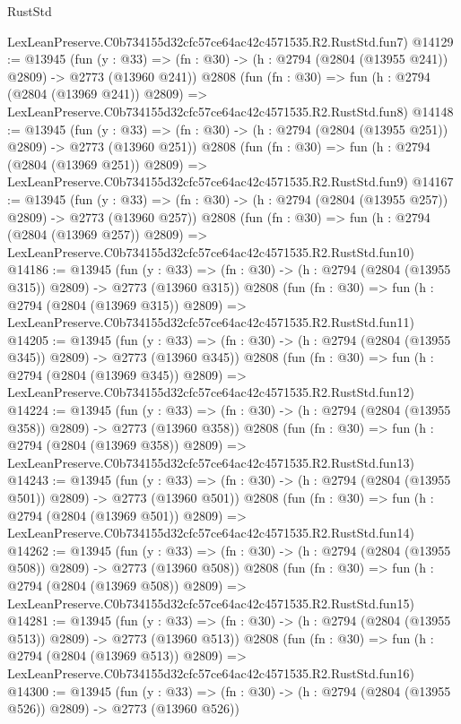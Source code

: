\begin{lexlean}{RustStd}
\begin{coremodule}
    LexLeanPreserve.C0b734155d32cfc57ce64ac42c4571535.R2.RustStd.fun7)
@14129 := @13945
    (fun (y : @33) => (fn : @30) -> (h : @2794 (@2804 (@13955 @241)) @2809) -> @2773 (@13960 @241))
    @2808
    (fun (fn : @30) =>
    fun (h : @2794 (@2804 (@13969 @241)) @2809) =>
    LexLeanPreserve.C0b734155d32cfc57ce64ac42c4571535.R2.RustStd.fun8)
@14148 := @13945
    (fun (y : @33) => (fn : @30) -> (h : @2794 (@2804 (@13955 @251)) @2809) -> @2773 (@13960 @251))
    @2808
    (fun (fn : @30) =>
    fun (h : @2794 (@2804 (@13969 @251)) @2809) =>
    LexLeanPreserve.C0b734155d32cfc57ce64ac42c4571535.R2.RustStd.fun9)
@14167 := @13945
    (fun (y : @33) => (fn : @30) -> (h : @2794 (@2804 (@13955 @257)) @2809) -> @2773 (@13960 @257))
    @2808
    (fun (fn : @30) =>
    fun (h : @2794 (@2804 (@13969 @257)) @2809) =>
    LexLeanPreserve.C0b734155d32cfc57ce64ac42c4571535.R2.RustStd.fun10)
@14186 := @13945
    (fun (y : @33) => (fn : @30) -> (h : @2794 (@2804 (@13955 @315)) @2809) -> @2773 (@13960 @315))
    @2808
    (fun (fn : @30) =>
    fun (h : @2794 (@2804 (@13969 @315)) @2809) =>
    LexLeanPreserve.C0b734155d32cfc57ce64ac42c4571535.R2.RustStd.fun11)
@14205 := @13945
    (fun (y : @33) => (fn : @30) -> (h : @2794 (@2804 (@13955 @345)) @2809) -> @2773 (@13960 @345))
    @2808
    (fun (fn : @30) =>
    fun (h : @2794 (@2804 (@13969 @345)) @2809) =>
    LexLeanPreserve.C0b734155d32cfc57ce64ac42c4571535.R2.RustStd.fun12)
@14224 := @13945
    (fun (y : @33) => (fn : @30) -> (h : @2794 (@2804 (@13955 @358)) @2809) -> @2773 (@13960 @358))
    @2808
    (fun (fn : @30) =>
    fun (h : @2794 (@2804 (@13969 @358)) @2809) =>
    LexLeanPreserve.C0b734155d32cfc57ce64ac42c4571535.R2.RustStd.fun13)
@14243 := @13945
    (fun (y : @33) => (fn : @30) -> (h : @2794 (@2804 (@13955 @501)) @2809) -> @2773 (@13960 @501))
    @2808
    (fun (fn : @30) =>
    fun (h : @2794 (@2804 (@13969 @501)) @2809) =>
    LexLeanPreserve.C0b734155d32cfc57ce64ac42c4571535.R2.RustStd.fun14)
@14262 := @13945
    (fun (y : @33) => (fn : @30) -> (h : @2794 (@2804 (@13955 @508)) @2809) -> @2773 (@13960 @508))
    @2808
    (fun (fn : @30) =>
    fun (h : @2794 (@2804 (@13969 @508)) @2809) =>
    LexLeanPreserve.C0b734155d32cfc57ce64ac42c4571535.R2.RustStd.fun15)
@14281 := @13945
    (fun (y : @33) => (fn : @30) -> (h : @2794 (@2804 (@13955 @513)) @2809) -> @2773 (@13960 @513))
    @2808
    (fun (fn : @30) =>
    fun (h : @2794 (@2804 (@13969 @513)) @2809) =>
    LexLeanPreserve.C0b734155d32cfc57ce64ac42c4571535.R2.RustStd.fun16)
@14300 := @13945
    (fun (y : @33) => (fn : @30) -> (h : @2794 (@2804 (@13955 @526)) @2809) -> @2773 (@13960 @526))

\end{coremodule}
\end{lexlean}
